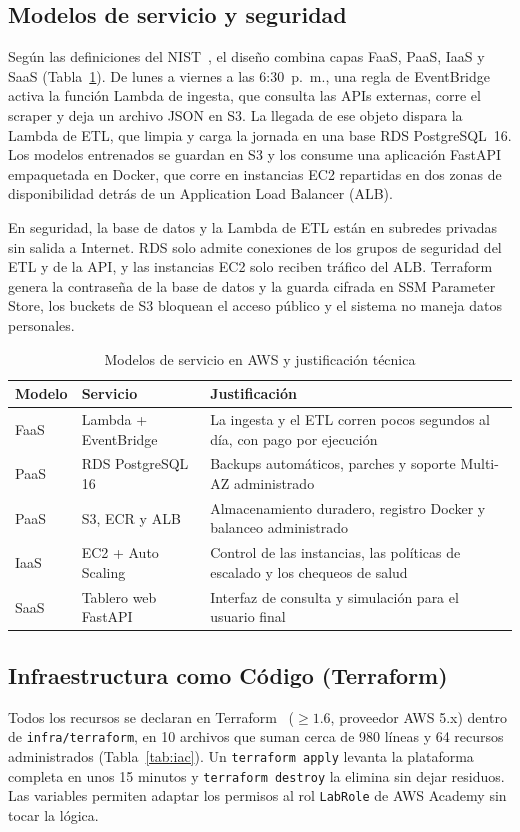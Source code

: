 \documentclass[conference]{IEEEtran}
\begin{document}
\subsection{Modelos de servicio y seguridad}
Según las definiciones del NIST~\cite{nist800145}, el diseño combina capas FaaS, PaaS, IaaS y SaaS (Tabla~\ref{tab:services}). De lunes a viernes a las 6:30~p.~m., una regla de EventBridge activa la función Lambda de ingesta, que consulta las APIs externas, corre el scraper y deja un archivo JSON en S3. La llegada de ese objeto dispara la Lambda de ETL, que limpia y carga la jornada en una base RDS PostgreSQL~16. Los modelos entrenados se guardan en S3 y los consume una aplicación FastAPI empaquetada en Docker, que corre en instancias EC2 repartidas en dos zonas de disponibilidad detrás de un Application Load Balancer (ALB).

En seguridad, la base de datos y la Lambda de ETL están en subredes privadas sin salida a Internet. RDS solo admite conexiones de los grupos de seguridad del ETL y de la API, y las instancias EC2 solo reciben tráfico del ALB. Terraform genera la contraseña de la base de datos y la guarda cifrada en SSM Parameter Store, los buckets de S3 bloquean el acceso público y el sistema no maneja datos personales.

\begin{table}[t]
\caption{Modelos de servicio en AWS y justificación técnica}
\label{tab:services}
\centering
\footnotesize
\begin{tabular}{@{}p{0.9cm}p{2.3cm}p{4.3cm}@{}}
\toprule
Modelo & Servicio & Justificación \\
\midrule
FaaS & Lambda + EventBridge & La ingesta y el ETL corren pocos segundos al día, con pago por ejecución \\
PaaS & RDS PostgreSQL 16 & Backups automáticos, parches y soporte Multi-AZ administrado \\
PaaS & S3, ECR y ALB & Almacenamiento duradero, registro Docker y balanceo administrado \\
IaaS & EC2 + Auto Scaling & Control de las instancias, las políticas de escalado y los chequeos de salud \\
SaaS & Tablero web FastAPI & Interfaz de consulta y simulación para el usuario final \\
\bottomrule
\end{tabular}
\end{table}

\subsection{Infraestructura como Código (Terraform)}
Todos los recursos se declaran en Terraform~\cite{terraform_aws} ($\geq 1.6$, proveedor AWS 5.x) dentro de \texttt{infra/terraform}, en 10 archivos que suman cerca de 980 líneas y 64 recursos administrados (Tabla~\ref{tab:iac}). Un \texttt{terraform apply} levanta la plataforma completa en unos 15 minutos y \texttt{terraform destroy} la elimina sin dejar residuos. Las variables permiten adaptar los permisos al rol \texttt{LabRole} de AWS Academy sin tocar la lógica.
\end{document}
